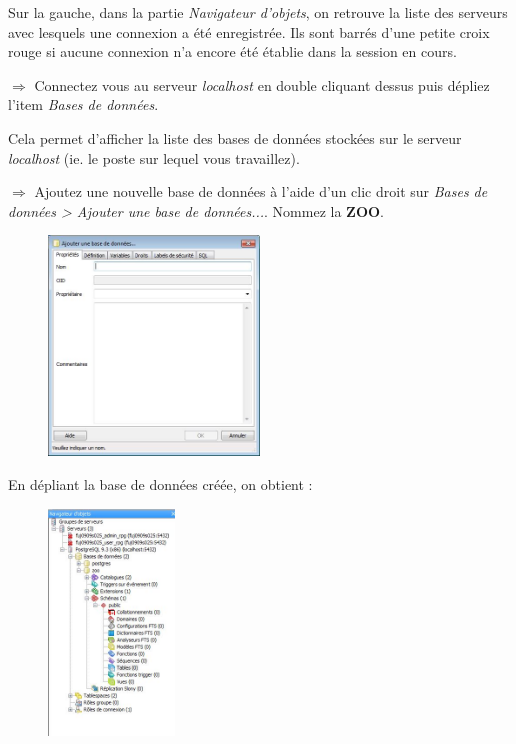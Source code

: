 \documentclass[11pt]{article}
\newcommand{\action}{$\Rightarrow$ }
\begin{document}
Sur la gauche, dans la partie \textit{Navigateur d'objets}, on retrouve la liste des serveurs avec lesquels une connexion a été enregistrée. Ils sont barrés d'une petite croix rouge si aucune connexion n'a encore été établie dans la session en cours.
		
\action Connectez vous au serveur \textit{localhost} en double cliquant dessus puis dépliez l'item \textit{Bases de données}. 
		
Cela permet d'afficher la liste des bases de données stockées sur le serveur \textit{localhost} (ie. le poste sur lequel vous travaillez).
		
\action Ajoutez une nouvelle base de données à l'aide d'un clic droit sur \textit{Bases de données > Ajouter une base de données...}. Nommez la \textbf{ZOO}.
\begin{figure}[H]
	\center \includegraphics[width=0.5\textwidth]{img/pgadmin_ajouter_base.jpg}\\[1em]
\end{figure}

En dépliant la base de données créée, on obtient :
\begin{figure}[H]
	\center \includegraphics[width=0.3\textwidth]{img/pgadmin_base_cree.jpg}\\[1em]
\end{figure}
	
\end{document}
